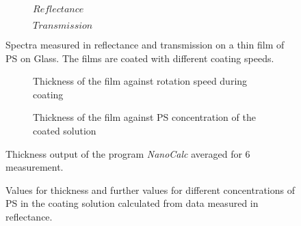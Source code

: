 \begin{figure}[h]
    \centering
    \begin{subfigure}[b]{0.70\textwidth}
        \centering
        
        \caption{$Reflectance$}
        \label{fig:y equals x}
    \end{subfigure}  
    

    \begin{subfigure}[b]{0.70\textwidth}
        \centering
           
        \caption{$Transmission$} 
        \label{fig:three sin x}
    \end{subfigure}

    \caption{Spectra measured in reflectance and transmission on a thin film of PS on Glass. The films are coated with different coating speeds.}
    \label{fig:SpecRefTrans}
\end{figure}


\begin{figure}[h]
    \centering
    \begin{subfigure}[b]{\textwidth}
        \centering
        
        \caption{Thickness of the film against rotation speed during coating}
        \label{fig:VglMethConcThick}
    \end{subfigure}

    \vspace{1cm}
    \begin{subfigure}[b]{\textwidth}
        \centering
           
        \caption{Thickness of the film against PS concentration of the coated solution} 
        \label{fig:VglMethRotThick}
    \end{subfigure}

    \caption{Thickness output of the program \textit{NanoCalc} averaged for 6 measurement.}
    \label{fig:thickconcrpm}
\end{figure}

\begin{figure}[h]
    
    \caption{Values for thickness and further values for different concentrations of PS in the coating solution calculated from data measured in reflectance.}
    \label{tab:ConcThickRef}
\end{figure}

